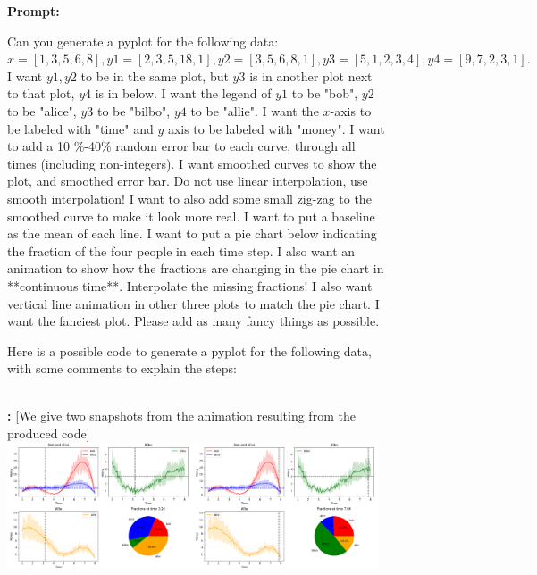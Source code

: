 \begin{figure}
\begin{AIbox}{\DV}
{    
    }
    \tcbline
    {\small \bf Prompt:} {\scriptsize Can you generate a pyplot for the following data: $x = [1, 3, 5, 6, 8], y1 = [2, 3, 5, 18, 1], y2 = [3, 5, 6, 8, 1], y3 = [5, 1, 2, 3, 4], y4 = [9, 7, 2, 3,  1].$ I want $y1, y2$ to be in the same plot, but $y3$ is in another plot next to that plot, $y4$ is in below. I want the legend of $y1$ to be "bob", $y2$ to be "alice", $y3$ to be "bilbo", $y4$ to be "allie".
    I want the $x$-axis to be labeled with "time" and $y$ axis to be labeled with "money".
    I want to add a 10 \%-40\% random error bar to each curve, through all times (including non-integers).
    I want smoothed curves to show the plot, and smoothed error bar. Do not use linear interpolation, use smooth interpolation!
    I want to also add some small zig-zag to the smoothed curve to make it look more real.
    I want to put a baseline as the mean of each line.
    I want to put a pie chart below indicating the fraction of the four people in each time step.
    I also want an animation to show how the fractions are changing in the pie chart in **continuous time**. Interpolate the missing fractions!
    I also want vertical line animation in other three plots to match the pie chart.
    I want the fanciest plot. Please add as many fancy things as possible.
    
    Here is a possible code to generate a pyplot for the following data, with some comments to explain the steps:} \\
    
    {\small \bf \DV:} {\scriptsize [We give two snapshots from the animation resulting from the produced code]} \\
    
    \includegraphics[width=0.49\textwidth]{figures/ff_1.png}\includegraphics[width=0.49\textwidth]{figures/ff_2.png}
    

\end{AIbox}
\end{figure}
